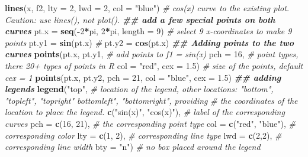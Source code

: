 \documentclass[
]{book}
\newenvironment{Shaded}{\begin{snugshade}}{\end{snugshade}}
\newcommand{\AttributeTok}[1]{\textcolor[rgb]{0.13,0.29,0.53}{#1}}
\newcommand{\CommentTok}[1]{\textcolor[rgb]{0.56,0.35,0.01}{\textit{#1}}}
\newcommand{\DecValTok}[1]{\textcolor[rgb]{0.00,0.00,0.81}{#1}}
\newcommand{\DocumentationTok}[1]{\textcolor[rgb]{0.56,0.35,0.01}{\textbf{\textit{#1}}}}
\newcommand{\FloatTok}[1]{\textcolor[rgb]{0.00,0.00,0.81}{#1}}
\newcommand{\FunctionTok}[1]{\textcolor[rgb]{0.13,0.29,0.53}{\textbf{#1}}}
\newcommand{\NormalTok}[1]{#1}
\newcommand{\OtherTok}[1]{\textcolor[rgb]{0.56,0.35,0.01}{#1}}
\newcommand{\SpecialCharTok}[1]{\textcolor[rgb]{0.81,0.36,0.00}{\textbf{#1}}}
\newcommand{\StringTok}[1]{\textcolor[rgb]{0.31,0.60,0.02}{#1}}
\begin{document}
\begin{Shaded}
\begin{Highlighting}[]
\FunctionTok{lines}\NormalTok{(x, f2, }\AttributeTok{lty =} \DecValTok{2}\NormalTok{, }\AttributeTok{lwd =} \DecValTok{2}\NormalTok{, }\AttributeTok{col =} \StringTok{"blue"}\NormalTok{)                    }\CommentTok{\# cos(x) curve to the existing plot. Caution: use lines(), not plot().}
\DocumentationTok{\#\# add a few special points on both curves}
\NormalTok{pt.x }\OtherTok{=} \FunctionTok{seq}\NormalTok{(}\SpecialCharTok{{-}}\DecValTok{2}\SpecialCharTok{*}\NormalTok{pi, }\DecValTok{2}\SpecialCharTok{*}\NormalTok{pi, }\AttributeTok{length =} \DecValTok{9}\NormalTok{)                             }\CommentTok{\# select 9 x{-}coordinates to make 9 points}
\NormalTok{pt.y1 }\OtherTok{=} \FunctionTok{sin}\NormalTok{(pt.x)                                               }\CommentTok{\# }
\NormalTok{pt.y2 }\OtherTok{=} \FunctionTok{cos}\NormalTok{(pt.x)}
\DocumentationTok{\#\# Adding points to the two curves}
\FunctionTok{points}\NormalTok{(pt.x, pt.y1,                    }\CommentTok{\# add points to f1 = sin(x)}
         \AttributeTok{pch =} \DecValTok{16}\NormalTok{,                     }\CommentTok{\# point types, there 20+ types of points in R}
         \AttributeTok{col =} \StringTok{"red"}\NormalTok{,}
         \AttributeTok{cex =} \FloatTok{1.5}\NormalTok{)                    }\CommentTok{\# size of the points, default cex = 1}
\FunctionTok{points}\NormalTok{(pt.x, pt.y2, }\AttributeTok{pch =} \DecValTok{21}\NormalTok{, }\AttributeTok{col =} \StringTok{"blue"}\NormalTok{, }\AttributeTok{cex =} \FloatTok{1.5}\NormalTok{)}
\DocumentationTok{\#\# adding legends}
\FunctionTok{legend}\NormalTok{(}\StringTok{"top"}\NormalTok{,      }\CommentTok{\# location of the legend, other locations: "bottom", "topleft", "topright" bottomleft", "bottomright", providing}
                   \CommentTok{\# the coordinates of the location to place the legend.}
              \FunctionTok{c}\NormalTok{(}\StringTok{"sin(x)"}\NormalTok{, }\StringTok{"cos(x)"}\NormalTok{),         }\CommentTok{\# label of the corresponding curves}
              \AttributeTok{pch =} \FunctionTok{c}\NormalTok{(}\DecValTok{16}\NormalTok{, }\DecValTok{21}\NormalTok{),               }\CommentTok{\# the corresponding point type}
              \AttributeTok{col =} \FunctionTok{c}\NormalTok{(}\StringTok{"red"}\NormalTok{, }\StringTok{"blue"}\NormalTok{),        }\CommentTok{\# corresponding color}
              \AttributeTok{lty =} \FunctionTok{c}\NormalTok{(}\DecValTok{1}\NormalTok{, }\DecValTok{2}\NormalTok{),                 }\CommentTok{\# corresponding line type}
              \AttributeTok{lwd =} \FunctionTok{c}\NormalTok{(}\DecValTok{2}\NormalTok{,}\DecValTok{2}\NormalTok{),                  }\CommentTok{\# corresponding line width}
              \AttributeTok{bty =} \StringTok{"n"}\NormalTok{)                     }\CommentTok{\# no box placed around the legend}
\end{Highlighting}
\end{Shaded}
\end{document}
